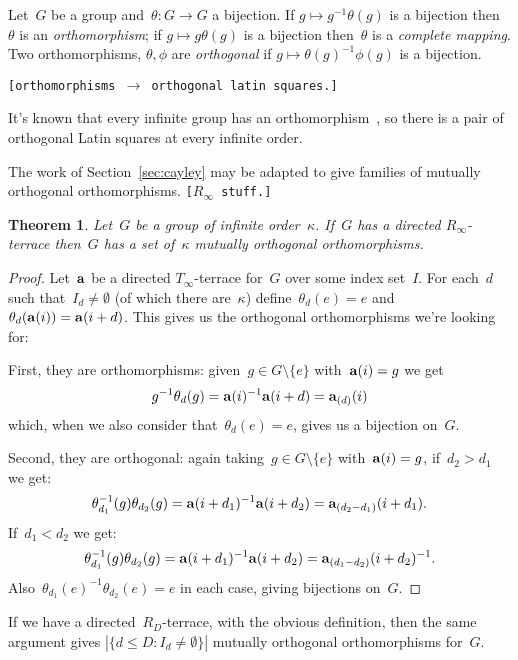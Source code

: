 \documentclass[12pt,a4paper]{article}
\newtheorem{thm}{Theorem}[section]
\begin{document}
Let~$G$ be a group and~$\theta: G \rightarrow G$ a bijection.  If $g \mapsto g^{-1}\theta(g)$ is a bijection then~$\theta$ is an {\em orthomorphism}; if  $g \mapsto g\theta(g)$ is a bijection then~$\theta$ is a {\em complete mapping}.  Two orthomorphisms, $\theta, \phi$ are {\em orthogonal} if $g \mapsto \theta(g)^{-1} \phi(g)$ is a bijection.

\texttt{[orthomorphisms $\rightarrow$ orthogonal latin squares.]}

It's known that every infinite group has an orthomorphism~\cite{Bateman50}, so there is a pair of orthogonal Latin squares at every infinite order.


The work of Section~\ref{sec:cayley} may be adapted to give families of mutually orthogonal orthomorphisms. \texttt{[$R_{\infty}$ stuff.]}



\begin{thm}
Let~$G$ be a group of infinite order~$\kappa$.  If~$G$ has a directed $R_{\infty}$-terrace then~$G$ has a set of~$ \kappa$ mutually orthogonal orthomorphisms. 
\end{thm}

\begin{proof}
Let~${\bf a}$ be a directed $T_{\infty}$-terrace for~$G$ over some index set~$I$.  For each~$d$ such that~$I_d \neq \emptyset$ (of which there are~$\kappa$) define~$\theta_d(e) = e$ and $\theta_d( {\bf a}(i) ) = {\bf a}(i+d)$.  This gives us the orthogonal orthomorphisms we're looking for:

First, they are orthomorphisms: given~$g \in G \setminus \{ e \}$ with~${\bf a}(i) = g$ we get
$$g^{-1}\theta_d(g) = {\bf a}(i)^{-1}{\bf a}(i+d) = {\bf a}_{(d)}(i)$$
which, when we also consider that~$\theta_d(e)=e$, gives us a bijection on~$G$.

Second, they are orthogonal: again taking~$g \in G \setminus \{ e \}$ with~${\bf a}(i) = g$, if~$d_2 > d_1$ we get: 
$$\theta_{d_1}^{-1}(g) \theta_{d_2}(g) =  {\bf a}(i+d_1)^{-1}{\bf a}(i+d_2)  = {\bf a}_{(d_2 - d_1)}(i+d_1) .       $$
If~$d_1 < d_2$ we get:
$$\theta_{d_1}^{-1}(g) \theta_{d_2}(g) =  {\bf a}(i+d_1)^{-1}{\bf a}(i+d_2)  = {\bf a}_{(d_1 - d_2)}(i+d_2)^{-1} .       $$
Also~$\theta_{d_1}(e)^{-1}\theta_{d_2}(e) =e$ in each case, giving bijections on~$G$.
\end{proof}

If we have a directed~$R_D$-terrace, with the obvious definition, then the same argument gives $ | \{ d \leq D : I_d \neq \emptyset \} |$ mutually orthogonal orthomorphisms for~$G$.
\end{document}

